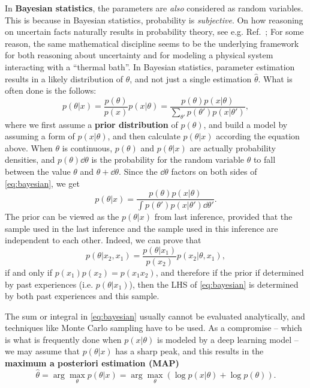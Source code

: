 \documentclass[hyperref, a4paper, 12pt]{report}
\newcommand*{\argmax}{\arg\max}
\newcommand*{\concept}[1]{{\textbf{#1}}}
\begin{document}
In \concept{Bayesian statistics}, the parameters are \emph{also} considered as random variables.
This is because in Bayesian statistics, probability is \emph{subjective}.
On how reasoning on uncertain facts naturally results in probability theory, see e.g. Ref.~\cite{jaynes2003probability};
For some reason, the same mathematical discipline seems to be the underlying framework for both reasoning about uncertainty and for modeling a physical system interacting with a ``thermal bath''.
In Bayesian statistics, parameter estimation results in a likely distribution of $\theta$,
and not just a single estimation $\hat{\theta}$.
What is often done is the follows:
\begin{equation}
    p(\theta | x) = \frac{p(\theta)}{p(x)} p(x | \theta) = \frac{p(\theta) p(x | \theta)}{\sum_{\theta'} p(\theta') p(x | \theta')},
    \label{eq:bayesian}
\end{equation}
where we first assume a \concept{prior distribution} of $p(\theta)$,
and build a model by assuming a form of $p(x | \theta)$,
and then calculate $p(\theta | x)$ according the equation above.
When $\theta$ is continuous, $p(\theta)$ and $p(\theta | x)$ are actually probability densities,
and $p(\theta) \dd{\theta}$ is the probability for the random variable $\theta$ to fall between the value $\theta$ and $\theta + \dd{\theta}$.
Since the $\dd{\theta}$ factors on both sides of \eqref{eq:bayesian}, we get 
\begin{equation}
    p(\theta | x) = \frac{p(\theta) p(x | \theta)}{\int p(\theta') p(x | \theta') \dd{\theta'}}.
\end{equation}
The prior can be viewed as the $p(\theta | x)$ from last inference,
provided that the sample used in the last inference and the sample used in this inference
are independent to each other.
Indeed, we can prove that 
\begin{equation}
    p(\theta | x_2, x_1) = \frac{p(\theta | x_1)}{p(x_2)} p(x_2 | \theta, x_1),
\end{equation}
if and only if $p(x_1) p(x_2) = p(x_1 x_2)$,
and therefore if the prior if determined by past experiences (i.e. $p(\theta | x_1)$),
then the LHS of \eqref{eq:bayesian} is determined by both past experiences and this sample.

The sum or integral in \eqref{eq:bayesian} usually cannot be evaluated analytically,
and techniques like Monte Carlo sampling have to be used.
As a compromise -- which is what is frequently done when $p(x | \theta)$ is modeled by a deep learning model
-- we may assume that $p(\theta | x)$ has a sharp peak,
and this results in the \concept{maximum a posteriori estimation (MAP)}
\begin{equation}
    \hat{\theta} = \argmax_\theta p(\theta | x) = \argmax_\theta (\log p(x | \theta) + \log p(\theta)).
    \label{eq:map}
\end{equation}
\end{document}

